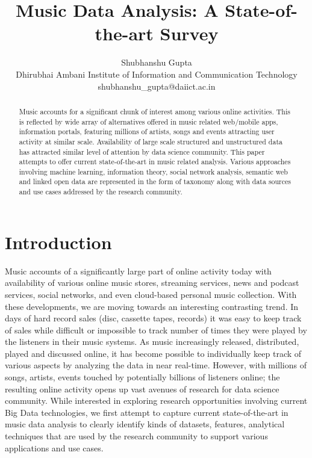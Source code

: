 \documentclass{proc}
\begin{document}
\title{Music Data Analysis: A State-of-the-art Survey}
\author{Shubhanshu Gupta  \\
Dhirubhai Ambani Institute of Information and Communication Technology\\
shubhanshu\_gupta@daiict.ac.in}
\maketitle



\begin{abstract}
Music accounts for a significant chunk of interest among various online activities. This is reflected by wide array of alternatives offered in music related web/mobile apps, information portals, featuring millions of artists, songs and events attracting user activity at similar scale. Availability of large scale structured and unstructured data has attracted similar level of attention by data science community. This paper attempts to offer current state-of-the-art in music related analysis. Various approaches involving machine learning, information theory, social network analysis, semantic web and linked open data are represented in the form of taxonomy along with data sources and use cases addressed by the research community.  
\end{abstract}

\section{Introduction}

Music accounts of a significantly large part of online activity today with availability of various online music stores, streaming services, news and podcast services, social networks, and even cloud-based personal music collection. With these developments, we are moving towards an interesting contrasting trend. In days of hard record sales (disc, cassette tapes, records) it was easy to keep track of sales while difficult or impossible to track number of times they were played by the listeners in their music systems. As music increasingly released, distributed, played and discussed online, it has become possible to individually keep track of various aspects by analyzing the data in near real-time. However, with millions of songs, artists, events touched by potentially billions of listeners online; the resulting online activity opens up vast avenues of research for data science community. While interested in exploring research opportunities involving current Big Data technologies, we first attempt to capture current state-of-the-art in music data analysis to clearly identify kinds of datasets, features, analytical techniques that are used by the research community to support various applications and use cases. \par
\end{document}
